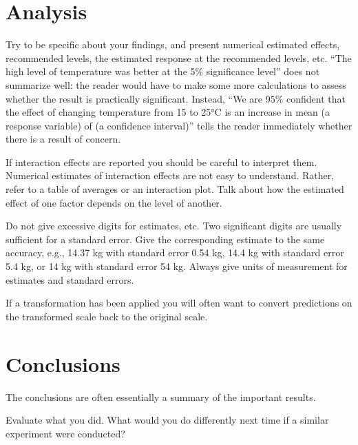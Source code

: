 \documentclass[12pt,a4paper]{article}
\begin{document}
\section{Analysis}\label{section3}


Try to be specific about your findings, and present numerical
estimated effects, recommended levels, the estimated response at the recommended levels,
etc. ``The high level of temperature was better at the 5\% significance level'' does not
summarize well: the reader would have to make some more calculations to assess whether
the result is practically significant. Instead, ``We are 95\% confident that the effect of
changing temperature from 15 to 25°C is an increase in mean (a response variable) of (a
confidence interval)'' tells the reader immediately whether there is a result of concern.

If interaction effects are reported you should be careful to interpret them. Numerical
estimates of interaction effects are not easy to understand. Rather, refer to a table of
averages or an interaction plot. Talk about how the estimated effect of one factor depends
on the level of another.

Do not give excessive digits for estimates, etc. Two significant digits are usually suﬀicient
for a standard error. Give the corresponding estimate to the same accuracy, e.g., 14.37 kg
with standard error 0.54 kg, 14.4 kg with standard error 5.4 kg, or 14 kg with standard
error 54 kg. Always give units of measurement for estimates and standard errors.

If a transformation has been applied you will often want to convert predictions on the
transformed scale back to the original scale.

\section{Conclusions}\label{section4}

The conclusions are often essentially a summary of the
important results.

Evaluate what you did. What would you do differently next time if a similar experiment
were conducted?
\end{document}
